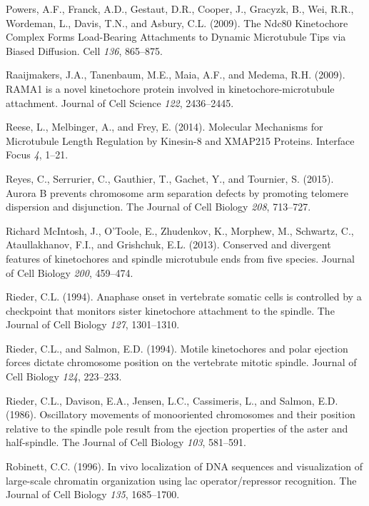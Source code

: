 \documentclass[12pt,a4paper,twoside,openright]{book}
\begin{document}
\hypertarget{ref-Powers2009a}{}
Powers, A.F., Franck, A.D., Gestaut, D.R., Cooper, J., Gracyzk, B., Wei,
R.R., Wordeman, L., Davis, T.N., and Asbury, C.L. (2009). The Ndc80
Kinetochore Complex Forms Load-Bearing Attachments to Dynamic
Microtubule Tips via Biased Diffusion. Cell \emph{136}, 865--875.

\hypertarget{ref-Raaijmakers2009}{}
Raaijmakers, J.A., Tanenbaum, M.E., Maia, A.F., and Medema, R.H. (2009).
RAMA1 is a novel kinetochore protein involved in kinetochore-microtubule
attachment. Journal of Cell Science \emph{122}, 2436--2445.

\hypertarget{ref-Reese2014a}{}
Reese, L., Melbinger, A., and Frey, E. (2014). Molecular Mechanisms for
Microtubule Length Regulation by Kinesin-8 and XMAP215 Proteins.
Interface Focus \emph{4}, 1--21.

\hypertarget{ref-Reyes2015}{}
Reyes, C., Serrurier, C., Gauthier, T., Gachet, Y., and Tournier, S.
(2015). Aurora B prevents chromosome arm separation defects by promoting
telomere dispersion and disjunction. The Journal of Cell Biology
\emph{208}, 713--727.

\hypertarget{ref-Mcintosh2013}{}
Richard McIntosh, J., O'Toole, E., Zhudenkov, K., Morphew, M., Schwartz,
C., Ataullakhanov, F.I., and Grishchuk, E.L. (2013). Conserved and
divergent features of kinetochores and spindle microtubule ends from
five species. Journal of Cell Biology \emph{200}, 459--474.

\hypertarget{ref-Rieder1994}{}
Rieder, C.L. (1994). Anaphase onset in vertebrate somatic cells is
controlled by a checkpoint that monitors sister kinetochore attachment
to the spindle. The Journal of Cell Biology \emph{127}, 1301--1310.

\hypertarget{ref-Rieder1994a}{}
Rieder, C.L., and Salmon, E.D. (1994). Motile kinetochores and polar
ejection forces dictate chromosome position on the vertebrate mitotic
spindle. Journal of Cell Biology \emph{124}, 223--233.

\hypertarget{ref-Rieder1986}{}
Rieder, C.L., Davison, E.A., Jensen, L.C., Cassimeris, L., and Salmon,
E.D. (1986). Oscillatory movements of monooriented chromosomes and their
position relative to the spindle pole result from the ejection
properties of the aster and half-spindle. The Journal of Cell Biology
\emph{103}, 581--591.

\hypertarget{ref-Robinett1996}{}
Robinett, C.C. (1996). In vivo localization of DNA sequences and
visualization of large-scale chromatin organization using lac
operator/repressor recognition. The Journal of Cell Biology \emph{135},
1685--1700.
\end{document}

